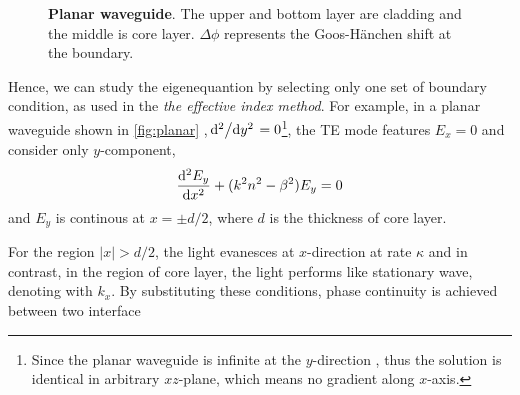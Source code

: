 \begin{figure}
\centering
{}
\caption{\textbf{Planar waveguide}. The upper and bottom layer are cladding and the middle is core layer. $\Delta \phi$ represents the Goos-H\"{a}nchen shift at the boundary.}
\label{fig:planar}
\end{figure}

Hence, we can study the eigenequantion by selecting only one set of boundary condition, as used in the \textit{the effective index method}. For example, in a planar waveguide shown in \autoref{fig:planar} ,$\dv*[2]{}{y}=0$\footnote{Since the planar waveguide is infinite at the $y$-direction , thus the solution is identical in arbitrary $xz$-plane, which means no gradient along $x$-axis.},
the TE mode features $E_x=0$ and consider only $y$-component, 
\begin{equation}
    \dv[2]{E_y}{x} + (k^2 n^2 - \beta^2)E_y =0
\end{equation}
and $E_y$ is continous at $x=\pm d/2$, where $d$ is the thickness of core layer.

For the region $|x|>d/2$, the light evanesces at $x$-direction at rate $\kappa$ and in contrast, in the region of core layer, the light performs like stationary wave, denoting with $k_x$. By substituting these conditions, phase continuity is achieved between two interface

